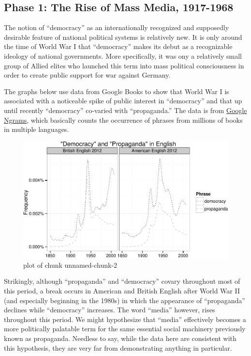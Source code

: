 \documentclass[12pt,book]{article}
\begin{document}
\subsection{Phase 1: The Rise of Mass Media,
1917-1968}\label{phase-1-the-rise-of-mass-media-1917-1968}

The notion of ``democracy'' as an internationally recognized and
supposedly desirable feature of national political systems is relatively
new. It is only around the time of World War I that ``democracy'' makes
its debut as a recognizable ideology of national governments. More
specifically, it was ony a relatively small group of Allied elites who
launched this term into mass political consciousness in order to create
public support for war against Germany.

The graphs below use data from Google Books to show that World War I is
associated with a noticeable spike of public interest in ``democracy''
and that up until recently ``democracy'' co-varied with ``propaganda.''
The data is from \href{https://books.google.com/ngrams}{Google Ngrams},
which basically counts the occurrence of phrases from millions of books
in multiple languages.

\begin{figure}[htbp]
\centering
\includegraphics{pacification_of_the_world_files/figure-latex/unnamed-chunk-2.pdf}
\caption{plot of chunk unnamed-chunk-2}
\end{figure}

Strikingly, although ``propaganda'' and ``democracy'' covary throughout
most of this period, a break occurs in American and British English
after World War II (and especially beginning in the 1980s) in which the
appearance of ``propaganda'' declines while ``democracy'' increases. The
word ``media'' however, rises throughout this period. We might
hypothesize that ``media'' effectively becomes a more politically
palatable term for the same essential social machinery previously known
as propaganda. Needless to say, while the data here are consistent with
this hypothesis, they are very far from demonstrating anything in
particular.
\end{document}
